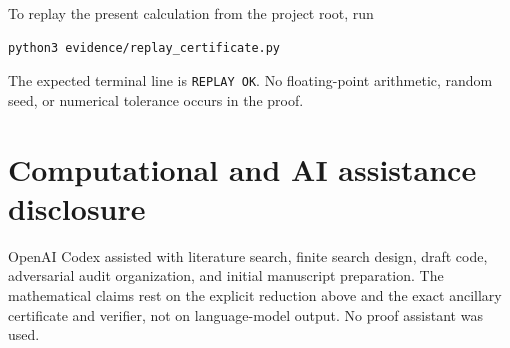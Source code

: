 \documentclass[11pt]{article}
\begin{document}
To replay the present calculation from the project root, run
\begin{verbatim}
python3 evidence/replay_certificate.py
\end{verbatim}
The expected terminal line is \texttt{REPLAY OK}.  No floating-point
arithmetic, random seed, or numerical tolerance occurs in the proof.

\section*{Computational and AI assistance disclosure}

OpenAI Codex assisted with literature search, finite search design, draft
code, adversarial audit organization, and initial manuscript preparation.
The mathematical claims rest on the explicit reduction above and the exact
ancillary certificate and verifier, not on language-model output.  No proof
assistant was used.



\end{document}
